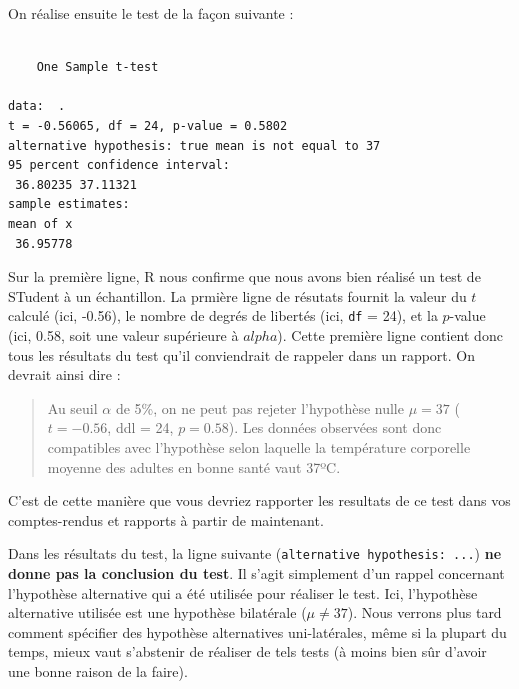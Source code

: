 \documentclass[a4paperpaper,]{article}
\newenvironment{Shaded}{\begin{snugshade}}{\end{snugshade}}
\newcommand{\DataTypeTok}[1]{\textcolor[rgb]{0.00,0.34,0.68}{#1}}
\newcommand{\DecValTok}[1]{\textcolor[rgb]{0.69,0.50,0.00}{#1}}
\newcommand{\KeywordTok}[1]{\textcolor[rgb]{0.12,0.11,0.11}{\textbf{#1}}}
\newcommand{\NormalTok}[1]{\textcolor[rgb]{0.12,0.11,0.11}{#1}}
\newcommand{\OperatorTok}[1]{\textcolor[rgb]{0.12,0.11,0.11}{#1}}
\newcommand{\StringTok}[1]{\textcolor[rgb]{0.75,0.01,0.01}{#1}}
\begin{document}
On réalise ensuite le test de la façon suivante :

\begin{Shaded}
\end{Shaded}

\begin{verbatim}

    One Sample t-test

data:  .
t = -0.56065, df = 24, p-value = 0.5802
alternative hypothesis: true mean is not equal to 37
95 percent confidence interval:
 36.80235 37.11321
sample estimates:
mean of x 
 36.95778 
\end{verbatim}

Sur la première ligne, R nous confirme que nous avons bien réalisé un test de STudent à un échantillon. La prmière ligne de résutats fournit la valeur du \(t\) calculé (ici, -0.56), le nombre de degrés de libertés (ici, \texttt{df} = 24), et la \(p\)-value (ici, 0.58, soit une valeur supérieure à \(alpha\)). Cette première ligne contient donc tous les résultats du test qu'il conviendrait de rappeler dans un rapport. On devrait ainsi dire :

\begin{quote}
Au seuil \(\alpha\) de 5\%, on ne peut pas rejeter l'hypothèse nulle \(\mu = 37\) (\(t = -0.56\), ddl = 24, \(p = 0.58\)). Les données observées sont donc compatibles avec l'hypothèse selon laquelle la température corporelle moyenne des adultes en bonne santé vaut 37ºC.
\end{quote}

C'est de cette manière que vous devriez rapporter les resultats de ce test dans vos comptes-rendus et rapports à partir de maintenant.

Dans les résultats du test, la ligne suivante (\texttt{alternative\ hypothesis:\ ...}) \textbf{ne donne pas la conclusion du test}. Il s'agit simplement d'un rappel concernant l'hypothèse alternative qui a été utilisée pour réaliser le test. Ici, l'hypothèse alternative utilisée est une hypothèse bilatérale (\(\mu \neq 37\)). Nous verrons plus tard comment spécifier des hypothèse alternatives uni-latérales, même si la plupart du temps, mieux vaut s'abstenir de réaliser de tels tests (à moins bien sûr d'avoir une bonne raison de la faire).
\end{document}

